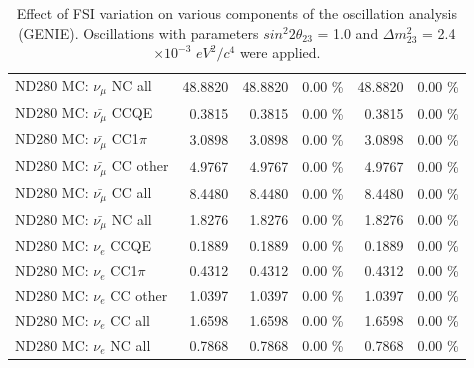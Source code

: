 \begin{table}
\begin{tabular}{| l | r | r  r | r  r |}
                                          ND280 MC: $\nu_{\mu}$ NC all &         48.8820 &         48.8820 &  0.00 \%  &         48.8820 &  0.00 \%  \\ 
                                      ND280 MC: $\bar{\nu_{\mu}}$ CCQE &          0.3815 &          0.3815 &  0.00 \%  &          0.3815 &  0.00 \%  \\ 
                                  ND280 MC: $\bar{\nu_{\mu}}$ CC1$\pi$ &          3.0898 &          3.0898 &  0.00 \%  &          3.0898 &  0.00 \%  \\ 
                                  ND280 MC: $\bar{\nu_{\mu}}$ CC other &          4.9767 &          4.9767 &  0.00 \%  &          4.9767 &  0.00 \%  \\ 
                                    ND280 MC: $\bar{\nu_{\mu}}$ CC all &          8.4480 &          8.4480 &  0.00 \%  &          8.4480 &  0.00 \%  \\ 
                                    ND280 MC: $\bar{\nu_{\mu}}$ NC all &          1.8276 &          1.8276 &  0.00 \%  &          1.8276 &  0.00 \%  \\ 
                                              ND280 MC: $\nu_{e}$ CCQE &          0.1889 &          0.1889 &  0.00 \%  &          0.1889 &  0.00 \%  \\ 
                                          ND280 MC: $\nu_{e}$ CC1$\pi$ &          0.4312 &          0.4312 &  0.00 \%  &          0.4312 &  0.00 \%  \\ 
                                          ND280 MC: $\nu_{e}$ CC other &          1.0397 &          1.0397 &  0.00 \%  &          1.0397 &  0.00 \%  \\ 
                                            ND280 MC: $\nu_{e}$ CC all &          1.6598 &          1.6598 &  0.00 \%  &          1.6598 &  0.00 \%  \\ 
                                            ND280 MC: $\nu_{e}$ NC all &          0.7868 &          0.7868 &  0.00 \%  &          0.7868 &  0.00 \%  \\ 
\hline
\end{tabular}
\caption{ 
  Effect of FSI variation
  on various components of the oscillation analysis (GENIE).
  Oscillations with parameters $sin^{2}2\theta_{23}$ = 1.0 and $\Delta m^{2}_{23}$ = 2.4$\times10^{-3}$ $eV^{2}/c^{4}$ were applied.  
}
\label{tab:genie_nuclear_effect}
\end{table}


\clearpage

%
%


